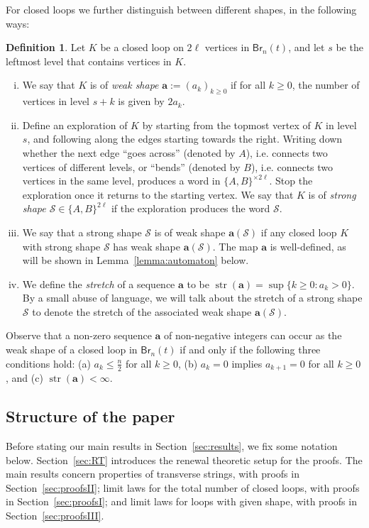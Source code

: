\documentclass[a4paper,11pt,reqno]{amsart}
\newcommand{\Br}{\mathsf{Br}}
\newcommand{\shape}{\mathscr{S}}
\newcommand{\mb}{\mathbf}
\newcommand{\str}{\operatorname{str}}
\theoremstyle{definition}
\newtheorem{definition}[lemma]{Definition}
\begin{document}
For closed loops we further distinguish between different shapes, in the following ways:

\begin{definition}\label{def:shape}
 Let $K$ be a closed loop on $2\ell$ vertices in $\Br_n(t)$, and let $s$ be the leftmost level that contains vertices in $K$.
 \begin{enumerate}[(i)]
  \item We say that $K$ is of \emph{weak shape} $\mb a := (a_k)_{k\geq 0}$ if for all $k\geq0$, the number of vertices in level $s+k$ is given by $2a_k$.
  \item Define an exploration of $K$ by starting from the topmost vertex of $K$ in level $s$, and following along the edges starting towards the right. Writing down whether the next edge ``goes across'' (denoted by $A$), i.e. connects two vertices of different levels, or ``bends'' (denoted by $B$), i.e. connects two vertices in the same level, produces a word in $\{A,B\}^{\times 2\ell}$. Stop the exploration once it returns to the starting vertex. We say that $K$ is of \emph{strong shape $\shape\in\{A,B\}^{2\ell}$} if the exploration produces the word $\shape$. 
  \item We say that a strong shape $\shape$ is of weak shape $\mb a(\shape)$ if any closed loop $K$ with strong shape $\shape$ has weak shape $\mb a(\shape)$. The map $\mb a$ is well-defined, as will be shown in Lemma~\ref{lemma:automaton} below. 
  \item We define the \emph{stretch} of a sequence $\mb a$ to be $\str(\mb a)= \sup\{k\geq 0:a_k>0\}$. By a small abuse of language, we will talk about the stretch of a strong shape $\shape$ to denote the stretch of the associated weak shape $\mb a(\shape)$.
 \end{enumerate}
\end{definition}
Observe that a non-zero sequence $\mb a$ of non-negative integers can occur as the weak shape of a closed loop in $\Br_n(t)$ if and only if the following three conditions hold: (a) $a_k\leq \frac{n}{2}$ for all $k\geq 0$, (b) $a_k=0$ implies $a_{k+1}=0$ for all $k\geq 0$, and (c) $\str(\mb a) < \infty$.


\subsection*{Structure of the paper}
Before stating our main results in Section~\ref{sec:results}, we fix some notation below. Section~\ref{sec:RT} introduces the renewal theoretic setup for the proofs.  The main results concern properties of transverse strings, with proofs in Section~\ref{sec:proofsII}; limit laws for the total number of closed loops, with proofs in Section~\ref{sec:proofsI}; and limit laws for loops with given shape, with proofs in Section~\ref{sec:proofsIII}. 
\end{document}
